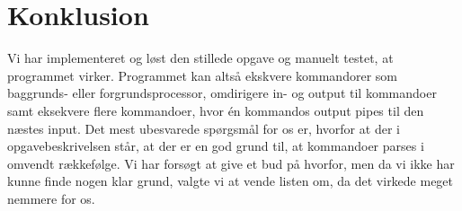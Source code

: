 \section{Konklusion}
Vi har implementeret og løst den stillede opgave og manuelt testet, at programmet virker. Programmet kan altså ekskvere kommandorer som baggrunds- eller forgrundsprocessor, omdirigere in- og output til kommandoer samt eksekvere flere kommandoer, hvor én kommandos output pipes til den næstes input. Det mest ubesvarede spørgsmål for os er, hvorfor at der i opgavebeskrivelsen står, at der er en god grund til, at kommandoer parses i omvendt rækkefølge. Vi har forsøgt at give et bud på hvorfor, men da vi ikke har kunne finde nogen klar grund, valgte vi at vende listen om, da det virkede meget nemmere for os. 
